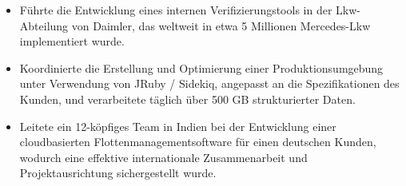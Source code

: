 \begin{minipage}{\linewidth}
\begin{itemize}
  \item Führte die Entwicklung eines internen Verifizierungstools in der Lkw-Abteilung von Daimler, das weltweit in etwa 5 Millionen Mercedes-Lkw implementiert wurde.
  \item Koordinierte die Erstellung und Optimierung einer Produktionsumgebung unter Verwendung von JRuby / Sidekiq, angepasst an die Spezifikationen des Kunden, und verarbeitete täglich über 500 GB strukturierter Daten.
  \item Leitete ein 12-köpfiges Team in Indien bei der Entwicklung einer cloudbasierten Flottenmanagementsoftware für einen deutschen Kunden, wodurch eine effektive internationale Zusammenarbeit und Projektausrichtung sichergestellt wurde.
\end{itemize}
\end{minipage}
\divider
